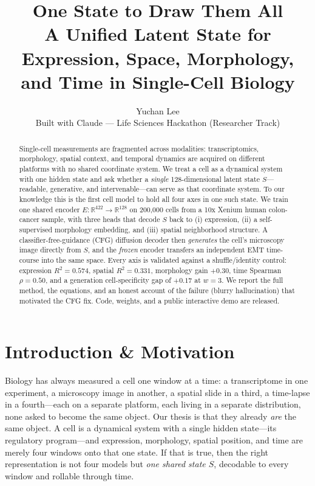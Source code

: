 \documentclass[10pt,twocolumn]{article}
\title{\vspace{-2em}\textbf{One State to Draw Them All}\\[0.2em]
{\large A Unified Latent State for Expression, Space, Morphology, and Time in Single-Cell Biology}}
\author{Yuchan Lee\\{\small Built with Claude --- Life Sciences Hackathon (Researcher Track)}}
\date{}
\begin{document}
\maketitle

\begin{abstract}
\small
Single-cell measurements are fragmented across modalities: transcriptomics,
morphology, spatial context, and temporal dynamics are acquired on different
platforms with no shared coordinate system. We treat a cell as a dynamical
system with one hidden state and ask whether a \emph{single} 128-dimensional
latent state $S$---readable, generative, and intervenable---can serve as that
coordinate system. To our knowledge this is the first cell model to hold all
four axes in one such state. We train
one shared encoder $E:\mathbb{R}^{422}\!\to\!\mathbb{R}^{128}$ on 200{,}000
cells from a 10x Xenium human colon-cancer sample, with three heads that decode
$S$ back to (i) expression, (ii) a self-supervised morphology embedding, and
(iii) spatial neighborhood structure. A classifier-free-guidance (CFG)
diffusion decoder then \emph{generates} the cell's microscopy image directly
from $S$, and the \emph{frozen} encoder transfers an independent EMT time-course
into the same space. Every axis is validated against a shuffle/identity control:
expression $R^2{=}0.574$, spatial $R^2{=}0.331$, morphology gain $+0.30$, time
Spearman $\rho{=}0.50$, and a generation cell-specificity gap of $+0.17$ at
$w{=}3$. We report the full method, the equations, and an honest account of the
failure (blurry hallucination) that motivated the CFG fix. Code, weights, and a
public interactive demo are released.
\end{abstract}

\section{Introduction \& Motivation}
Biology has always measured a cell one window at a time: a transcriptome in one
experiment, a microscopy image in another, a spatial slide in a third, a
time-lapse in a fourth---each on a separate platform, each living in a separate
distribution, none asked to become the same object. Our thesis is that they
already \emph{are} the same object. A cell is a dynamical system with a single
hidden state---its regulatory program---and expression, morphology, spatial
position, and time are merely four windows onto that one state. If that is true,
then the right representation is not four models but \emph{one shared state
$S$}, decodable to every window and rollable through time.
\end{document}

